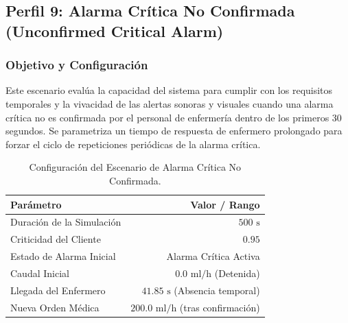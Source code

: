 \documentclass[11pt,a4paper]{article}
\begin{document}
\subsection{Perfil 9: Alarma Crítica No Confirmada (Unconfirmed Critical Alarm)}
\subsubsection{Objetivo y Configuración}
Este escenario evalúa la capacidad del sistema para cumplir con los requisitos temporales y la vivacidad de las alertas sonoras y visuales cuando una alarma crítica no es confirmada por el personal de enfermería dentro de los primeros 30 segundos. Se parametriza un tiempo de respuesta de enfermero prolongado para forzar el ciclo de repeticiones periódicas de la alarma crítica.

\begin{table}[H]
    \centering
    \begin{tabular}{lr}
        \toprule
        \textbf{Parámetro} & \textbf{Valor / Rango} \\
        \midrule
        Duración de la Simulación & $500\text{ s}$ \\
        Criticidad del Cliente & $0.95$ \\
        Estado de Alarma Inicial & Alarma Crítica Activa \\
        Caudal Inicial & $0.0\text{ ml/h}$ (Detenida) \\
        Llegada del Enfermero & $41.85\text{ s}$ (Absencia temporal) \\
        Nueva Orden Médica & $200.0\text{ ml/h}$ (tras confirmación) \\
        \bottomrule
    \end{tabular}
    \caption{Configuración del Escenario de Alarma Crítica No Confirmada.}
    \label{tab:config_alarma_no_confirmada}
\end{table}
\end{document}
